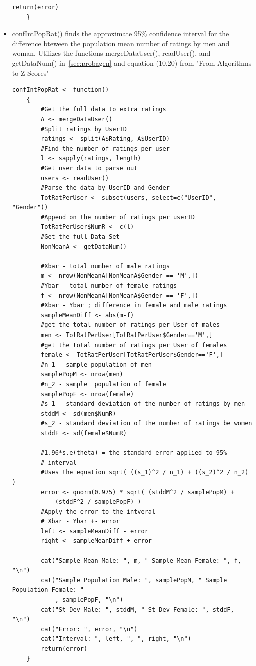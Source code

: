 \documentclass[11pt]{article}  %
\begin{document}
\begin{itemize}
\begin{lstlisting}[basicstyle=\small]
    	return(error)
    }
    \end{lstlisting}
    
    \label{sec:CIPR}
    \item confIntPopRat() finds the approximate 95\% confidence interval for the difference bteween the population mean number of ratings by men and woman. Utilizes the functions mergeDataUser(), readUser(), and getDataNum() in~\ref{sec:probagen} and equation (10.20) from "From Algorithms to Z-Scores"
    \begin{lstlisting}[basicstyle=\small]
    confIntPopRat <- function()
    {
    	#Get the full data to extra ratings
    	A <- mergeDataUser()
    	#Split ratings by UserID
    	ratings <- split(A$Rating, A$UserID)
    	#Find the number of ratings per user
    	l <- sapply(ratings, length)
    	#Get user data to parse out
    	users <- readUser()
    	#Parse the data by UserID and Gender
    	TotRatPerUser <- subset(users, select=c("UserID", "Gender"))
    	#Append on the number of ratings per userID
    	TotRatPerUser$NumR <- c(l)
    	#Get the full Data Set
    	NonMeanA <- getDataNum()
    
    	#Xbar - total number of male ratings
    	m <- nrow(NonMeanA[NonMeanA$Gender == 'M',])
    	#Ybar - total number of female ratings
    	f <- nrow(NonMeanA[NonMeanA$Gender == 'F',])
    	#Xbar - Ybar ; difference in female and male ratings
    	sampleMeanDiff <- abs(m-f)
    	#get the total number of ratings per User of males
    	men <- TotRatPerUser[TotRatPerUser$Gender=='M',]
    	#get the total number of ratings per User of females
    	female <- TotRatPerUser[TotRatPerUser$Gender=='F',]
    	#n_1 - sample population of men 
    	samplePopM <- nrow(men)
    	#n_2 - sample  population of female
    	samplePopF <- nrow(female)
    	#s_1 - standard deviation of the number of ratings by men
    	stddM <- sd(men$NumR)
    	#s_2 - standard deviation of the number of ratings be women
    	stddF <- sd(female$NumR)
    
    	#1.96*s.e(theta) = the standard error applied to 95%
    	# interval
    	#Uses the equation sqrt( ((s_1)^2 / n_1) + ((s_2)^2 / n_2) ) 
    	error <- qnorm(0.975) * sqrt( (stddM^2 / samplePopM) + 
    	    (stddF^2 / samplePopF) )
    	#Apply the error to the intveral
    	# Xbar - Ybar +- error
    	left <- sampleMeanDiff - error
    	right <- sampleMeanDiff + error
    
    	cat("Sample Mean Male: ", m, " Sample Mean Female: ", f, "\n")
    	cat("Sample Population Male: ", samplePopM, " Sample Population Female: "
    	    , samplePopF, "\n")
    	cat("St Dev Male: ", stddM, " St Dev Female: ", stddF, "\n")
    	cat("Error: ", error, "\n")
    	cat("Interval: ", left, ", ", right, "\n")
    	return(error)
    }
    \end{lstlisting}
    

\end{itemize}
\end{document}
